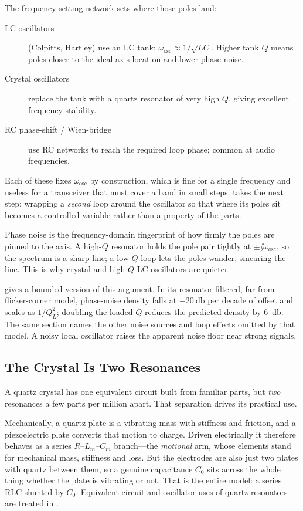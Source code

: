 The frequency-setting network sets where those poles land:
\begin{description}
\item[LC oscillators] (Colpitts, Hartley) use an LC tank; \(\omega_{\text{osc}}
\approx 1/\sqrt{LC}\). Higher tank \(Q\) means poles closer to the ideal axis
location and lower phase noise.
\item[Crystal oscillators] replace the tank with a quartz resonator of very high
\(Q\), giving excellent frequency stability.
\item[RC phase-shift / Wien-bridge] use RC networks to reach the required loop
phase; common at audio frequencies.
\end{description}
Each of these fixes \(\omega_{\text{osc}}\) by construction, which is fine for a
single frequency and useless for a transceiver that must cover a band in small steps.
 takes the next step: wrapping a \emph{second} loop around the
oscillator so that where its poles sit becomes a controlled variable rather than a
property of the parts.

\begin{physicalbox}
Phase noise is the frequency-domain fingerprint of how firmly the poles are
pinned to the axis. A high-\(Q\) resonator holds the pole pair tightly at
\(\pm\jj\omega_{\text{osc}}\), so the spectrum is a sharp line; a low-\(Q\) loop
lets the poles wander, smearing the line. This is why crystal and high-\(Q\) LC
oscillators are quieter.

 gives a bounded version of this argument. In its
resonator-filtered, far-from-flicker-corner model, phase-noise density falls at
\(-\SI{20}{\decibel}\) per decade of offset and scales as \(1/Q_L^2\); doubling the
loaded \(Q\) reduces the predicted density by \SI{6}{\decibel}. The same section
names the other noise sources and loop effects omitted by that model. A noisy local
oscillator raises the apparent noise floor near strong signals.
\end{physicalbox}

\subsection{The Crystal Is Two Resonances}
\label{sec:crystal}
A quartz crystal has one equivalent circuit built from familiar parts, but \emph{two}
resonances a few parts per million apart. That separation drives its practical use.

Mechanically, a quartz plate is a vibrating mass with stiffness and friction, and a
piezoelectric plate converts that motion to charge. Driven electrically it therefore
behaves as a series \(R\)--\(L_m\)--\(C_m\) branch---the \emph{motional} arm, whose
elements stand for mechanical mass, stiffness and loss. But the electrodes are also
just two plates with quartz between them, so a genuine capacitance \(C_0\) sits across
the whole thing whether the plate is vibrating or not. That is the entire model: a
series RLC shunted by \(C_0\).
Equivalent-circuit and oscillator uses of quartz resonators are treated in
\cite[pp.~313--318]{free2022rfmicrowave}.


